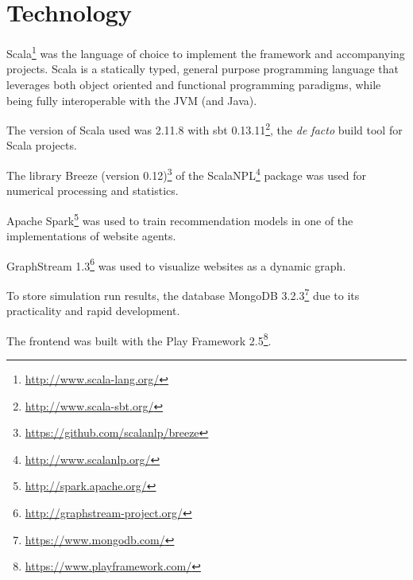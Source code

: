 \section{Technology}

Scala\footnote{\url{http://www.scala-lang.org/}} was the language of choice to 
implement the framework and accompanying projects. Scala is a statically typed, 
general purpose programming language that leverages both object oriented and 
functional programming paradigms, while being fully interoperable with the JVM 
(and Java).

The version of Scala used was 2.11.8 with sbt 
0.13.11\footnote{\url{http://www.scala-sbt.org/}}, the \textit{de facto} build 
tool for Scala projects.

The library Breeze (version 
0.12)\footnote{\url{https://github.com/scalanlp/breeze}} of the 
ScalaNPL\footnote{\url{http://www.scalanlp.org/}} package was used 
for numerical processing and statistics.

Apache Spark\footnote{\url{http://spark.apache.org/}} was used 
to train recommendation models in one of the implementations of website agents. 

GraphStream 1.3\footnote{\url{http://graphstream-project.org/}} was used to 
visualize websites as a dynamic graph.

To store simulation run results, the database MongoDB 
3.2.3\footnote{\url{https://www.mongodb.com/}} due to its practicality and 
rapid development.

The frontend was built with the Play Framework 
2.5\footnote{\url{https://www.playframework.com/}}.
